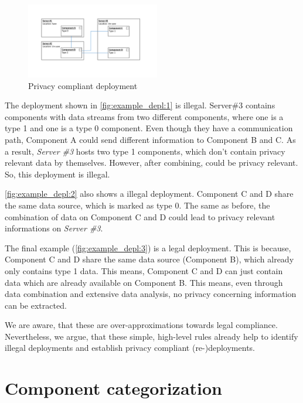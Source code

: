 	
\begin{figure}
	\begin{center}
		\includegraphics[trim = 35mm 45mm 40mm 35mm, clip, width=0.52\textwidth]{graphs/deployment_example_3}
	\end{center}
	\caption{Privacy compliant deployment}
	\label{fig:example_depl:3}
\end{figure}

The deployment shown in \autoref{fig:example_depl:1} is illegal. Server\#3 contains components with data streams from two different components, where one is a type 1 and one is a type 0 component. Even though they have a communication path, Component A could send different information to Component B and C. As a result, \textit{Server \#3} hosts two type 1 components, which don't contain privacy relevant data by themselves. However, after combining, could be privacy relevant. So, this deployment is illegal.

\autoref{fig:example_depl:2} also shows a illegal deployment. Component C and D share the same data source, which is marked as type 0. The same as before, the combination of data on Component C and D could lead to privacy relevant informations on \textit{Server \#3}.

The final example (\autoref{fig:example_depl:3}) is a legal deployment. This is because, Component C and D share the same data source (Component B), which already only contains type 1 data. This means, Component C and D can just contain data which are already available on Component B. This means, even through data combination and extensive data analysis, no privacy concerning information can be extracted.

We are aware, that these are over-approximations towards legal compliance. Nevertheless, we argue, that these simple, high-level rules already help to identify illegal deployments and establish privacy compliant (re-)deployments.


\section{Component categorization}
\label{sec:PrivacyConcept:comp_cat}

